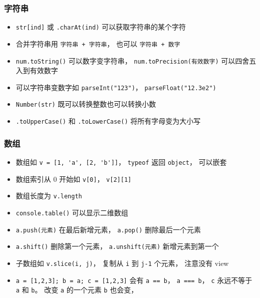 \subsubsection{字符串}
\begin{itemize}
\item \verb|str[ind]| 或 \verb|.charAt(ind)| 可以获取字符串的某个字符
\item 合并字符串用 \verb|字符串 + 字符串|， 也可以 \verb|字符串 + 数字|
\item \verb|num.toString()| 可以数字变字符串， \verb|num.toPrecision(有效数字)| 可以四舍五入到有效数字
\item 可以字符串变数字如 \verb|parseInt("123")|， \verb|parseFloat("12.3e2")|
\item \verb|Number(str)| 既可以转换整数也可以转换小数
\item \verb|.toUpperCase()| 和 \verb|.toLowerCase()| 将所有字母变为大小写
\end{itemize}


\subsubsection{数组}
\begin{itemize}
\item 数组如 \verb|v = [1, 'a', [2, 'b']]|， \verb|typeof| 返回 \verb|object|， 可以嵌套
\item 数组索引从 0 开始如 \verb|v[0]|， \verb|v[2][1]|
\item 数组长度为 \verb|v.length|
\item \verb|console.table()| 可以显示二维数组
\item \verb|a.push(元素)| 在最后新增元素， \verb|a.pop()| 删除最后一个元素
\item \verb|a.shift()| 删除第一个元素， \verb|a.unshift(元素)| 新增元素到第一个
\item 子数组如 \verb|v.slice(i, j)|， 复制从 \verb|i| 到 \verb|j-1| 个元素， 注意没有 view
\item \verb|a = [1,2,3]; b = a; c = [1,2,3]| 会有 \verb|a == b|， \verb|a === b|， \verb|c| 永远不等于 \verb|a| 和 \verb|b|。 改变 \verb|a| 的一个元素 \verb|b| 也会变， 
\end{itemize}

